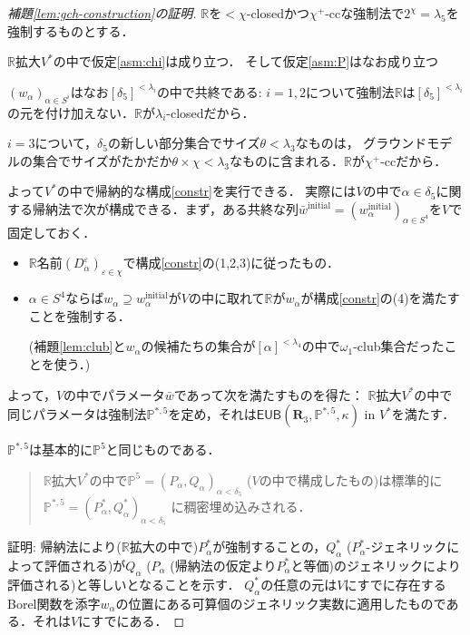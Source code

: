 \documentclass[uplatex,dvipdfmx]{jsarticle}
\newcommand{\EUB}{\mathsf{EUB}}
\newcommand{\relR}{\mathbf{R}}
\newcommand{\ve}{\varepsilon}
\newcommand{\Pa}{\mathbb{P}^5}
\newcommand{\PaB}{\mathbb{P}^{*,5}}
\newcommand{\mR}{\mathbb{R}}
\theoremstyle{definition}
\newenvironment{reason}
{
	\begin{mdframed}[backgroundcolor=reasonbg,linewidth=0]
		\color{reasontext}
		\small
	}
	{
	\end{mdframed}
}
\begin{document}
	
	\begin{proof}[補題\ref{lem:gch-construction}の証明]
		$\mR$を${<}\chi$-closedかつ$\chi^+$-ccな強制法で$2^\chi=\lambda_5$を強制するものとする．
		
		$\mR$拡大$V^*$の中で仮定\ref{asm:chi}は成り立つ．
		そして仮定\ref{asm:P}はなお成り立つ
		\begin{reason}
		$(w_\alpha)_{\alpha\in S^i}$はなお$[\delta_5]^{{<}\lambda_i}$の中で共終である:
		$i=1,2$について強制法$\mR$は$[\delta_5]^{{<}\lambda_i}$の元を付け加えない．$\mR$が$\lambda_i$-closedだから．
		
		$i=3$について，$\delta_5$の新しい部分集合でサイズ$\theta<\lambda_3$なものは，
		グラウンドモデルの集合でサイズがたかだか$\theta\times \chi<\lambda_3$なものに含まれる．$\mR$が$\chi^+$-ccだから．
		\end{reason}
		
		よって$V^*$の中で帰納的な構成\ref{constr}を実行できる．
		実際には$V$の中で$\alpha\in \delta_5$に関する帰納法で次が構成できる．まず，ある共終な列$\bar w^{\text{initial}}=(w^{\text{initial}}_\alpha)_{\alpha\in S^4}$を$V$で固定しておく．
		\begin{itemize}
			\item $\mR$名前$(D^\ve_\alpha)_{\ve\in \chi}$で構成\ref{constr}の(1,2,3)に従ったもの．
			\item $\alpha\in S^4$ならば$w_\alpha\supseteq w^\text{initial}_\alpha$が$V$の中に取れて$\mR$が$w_\alpha$が構成\ref{constr}の(4)を満たすことを強制する．
			
			(補題\ref{lem:club}と$w_\alpha$の候補たちの集合が$[\alpha]^{{<}\lambda_4}$の中で$\omega_1$-club集合だったことを使う．)
		\end{itemize}
		
		よって，$V$の中でパラメータ$\bar w$であって次を満たすものを得た： 
		$\mR$拡大$V^*$の中で同じパラメータは強制法$\PaB$を定め，それは$\EUB(\relR_3, \PaB,\kappa)$ in $V^*$を満たす．
		
		
		$\PaB$は基本的に$\Pa$と同じものである．
		\begin{quote}
			$\mR$拡大$V^*$の中で$\Pa=(P_\alpha,Q_\alpha)_{\alpha<\delta_5}$ ($V$の中で構成したもの)は標準的に$\PaB=(P^*_\alpha,Q^*_\alpha)_{\alpha<\delta_5}$ に稠密埋め込みされる．
		\end{quote}
		
		証明: 帰納法により($\mR$拡大の中で)$P^*_\alpha$が強制することの，$Q^*_\alpha$ ($P^*_\alpha$-ジェネリックによって評価される)が$Q_\alpha$ ($P_\alpha$ (帰納法の仮定より$P^*_\alpha$と等価)のジェネリックにより評価される)と等しいとなることを示す．
		$Q^*_\alpha$の任意の元は$V$にすでに存在するBorel関数を添字$w_\alpha$の位置にある可算個のジェネリック実数に適用したものである．それは$V$にすでにある．
		

\end{proof}
\end{document}
